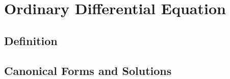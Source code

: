 \chapter{Ordinary Differential Equation}

\section{Definition}

\section{Canonical Forms and Solutions}
